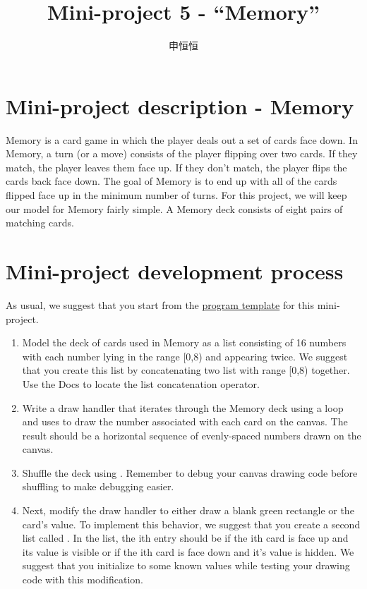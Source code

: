 \documentclass[a4paper,10pt]{article}
\title{Mini-project 5 - “Memory”}
\author{申恒恒}
\begin{document}
\begin{CJK}{UTF8}{gkai}
\maketitle

\section*{Mini-project description - Memory}

\noindent Memory is a card game in which the player deals out a set of cards face down. In Memory, a turn (or a move) consists of the player flipping over two cards. If they match, the player leaves them face up. If they don't match, the player flips the cards back face down. The goal of Memory is to end up with all of the cards flipped face up in the minimum number of turns. For this project, we will keep our model for Memory fairly simple. A Memory deck consists of eight pairs of matching cards.

\section*{Mini-project development process}

\noindent As usual, we suggest that you start from the \href{http://www.codeskulptor.org/#examples-memory_template.py}{program template} for this mini-project.
\begin{enumerate}


\item Model the deck of cards used in Memory as a list consisting of 16 numbers with each number lying in the range [0,8) and appearing twice. We suggest that you create this list by concatenating two list with range [0,8) together. Use the Docs to locate the list concatenation operator.

\item Write a draw handler that iterates through the Memory deck using a {\color{red}{for}} loop and uses {\color{red}{draw\_text}} to draw the number associated with each card on the canvas. The result should be a horizontal sequence of evenly-spaced numbers drawn on the canvas.

\item Shuffle the deck using {\color{red}{random.shuffle()}}. Remember to debug your canvas drawing code before shuffling to make debugging easier.

\item Next, modify the draw handler to either draw a blank green rectangle or the card's value. To implement this behavior, we suggest that you create a second list called {\color{red}{exposed}}. In the {\color{red}{exposed}} list, the ith entry should be {\color{red}{True}} if the ith card is face up and its value is visible or {\color{red}{False}} if the ith card is face down and it's value is hidden. We suggest that you initialize {\color{red}{exposed}} to some known values while testing your drawing code with this modification.


\end{enumerate}
\end{CJK}
\end{document}
